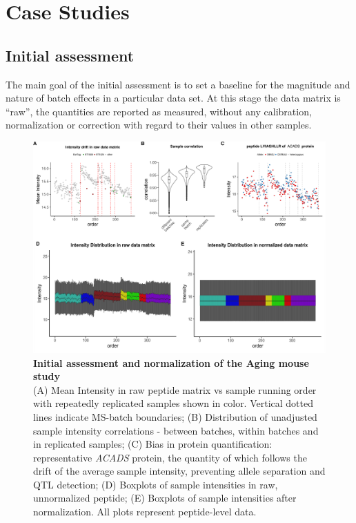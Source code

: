 \documentclass[num-refs]{wiley-article}
\begin{document}
\section{Case Studies}\label{subsec:case_studies}
\subsection{Initial assessment}
The main goal of the initial assessment is to set a baseline for the magnitude and nature of batch effects in a particular data set. At this stage the data matrix is “raw”, the quantities are reported as measured, without any calibration, normalization or correction with regard to their values in other samples.


\begin{figure}[hbt]
	\includegraphics[width=\textwidth]{figures/Fig2_initial_assessment_v1.pdf}
	
	\caption{\textbf{Initial assessment and normalization of the Aging mouse study} \\
		\footnotesize
		(A) Mean Intensity in raw peptide matrix vs sample running order with repeatedly replicated samples shown in color. Vertical dotted lines indicate MS-batch boundaries; (B) Distribution of unadjusted sample intensity correlations - between batches, within batches and in replicated samples; (C) Bias in protein quantification: representative \textit{ACADS} protein, the quantity of which follows the drift of the average sample intensity, preventing allele separation and QTL detection; (D) Boxplots of sample intensities in raw, unnormalized peptide; (E) Boxplots of sample intensities after normalization. All plots represent peptide-level data.}
	\label{fig:batch_fig2_initAssessment}
\end{figure}
\end{document}
